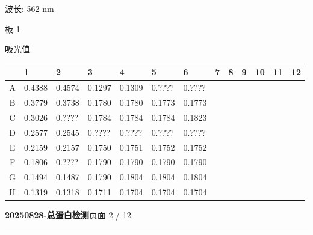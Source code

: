\documentclass[UTF8,10pt,a4paper,fontset=fandol]{ctexart}
\newcommand{\handwritten}[1]{#1}
\begin{document}

\medskip
\noindent 波长: 562 nm

\medskip
\noindent 板 1

\noindent 吸光值

\begin{center}
\scriptsize
\begin{tabular}{c|*{12}{p{0.42cm}|}}
 & 1 & 2 & 3 & 4 & 5 & 6 & 7 & 8 & 9 & 10 & 11 & 12\\ \hline
A & 0.4388 & 0.4574 & 0.1297 & 0.1309 & 0.???? & 0.???? & & & & & & \\ \hline
B & 0.3779 & 0.3738 & 0.1780 & 0.1780 & 0.1773 & 0.1773 & & & & & & \\ \hline
C & 0.3026 & 0.???? & 0.1784 & 0.1784 & 0.1784 & 0.1823 & & & & & & \\ \hline
D & 0.2577 & 0.2545 & 0.???? & 0.???? & 0.???? & 0.???? & & & & & & \\ \hline
E & 0.2159 & 0.2157 & 0.1750 & 0.1751 & 0.1752 & 0.1752 & & & & & & \\ \hline
F & 0.1806 & 0.???? & 0.1790 & 0.1790 & 0.1790 & 0.1790 & & & & & & \\ \hline
G & 0.1494 & 0.1487 & 0.1790 & 0.1804 & 0.1804 & 0.1804 & & & & & & \\ \hline
H & 0.1319 & 0.1318 & 0.1711 & 0.1704 & 0.1704 & 0.1704 & & & & & & \\ \hline
\end{tabular}
\end{center}


\handwritten{}

\handwritten{}

\newpage

\begin{flushleft}
\textbf{20250828-总蛋白检测}\hfill 页面 2 / 12
\end{flushleft}
\hrule
\end{document}
